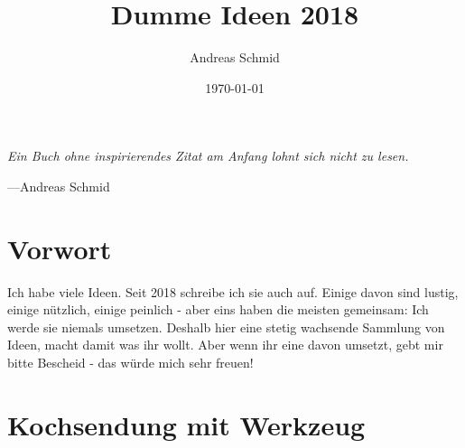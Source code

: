\documentclass[a5paper,pagesize,10pt,bibtotoc,pointlessnumbers,normalheadings,DIV=9,twoside=false]{scrbook}
\title{Dumme Ideen 2018}
\author{Andreas Schmid}
\date{\today}
\begin{document}

\maketitle

\newpage{}
\thispagestyle {empty}

\vspace*{2cm}

\begin{center}
	\Large{\parbox{10cm}{
		\begin{raggedright}
		{\Large 
			\textit{Ein Buch ohne inspirierendes Zitat am Anfang lohnt sich nicht zu lesen.}
		}
	
		\vspace{.5cm}\hfill{---Andreas Schmid}
		\end{raggedright}
	}
}
\end{center}

\newpage


\singlespacing
\tableofcontents 

\onehalfspacing

\chapter*{Vorwort}
Ich habe viele Ideen.
Seit 2018 schreibe ich sie auch auf.
Einige davon sind lustig, einige nützlich, einige peinlich - aber eins haben die meisten gemeinsam: Ich werde sie niemals umsetzen.
Deshalb hier eine stetig wachsende Sammlung von Ideen, macht damit was ihr wollt.
Aber wenn ihr eine davon umsetzt, gebt mir bitte Bescheid - das würde mich sehr freuen!




\chapter{Kochsendung mit Werkzeug}
\end{document}
